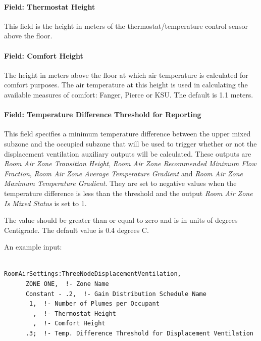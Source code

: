 \paragraph{Field: Thermostat Height}\label{field-thermostat-height-1}

This field is the height in meters of the thermostat/temperature control sensor above the floor.

\paragraph{Field: Comfort Height}\label{field-comfort-height}

The height in meters above the floor at which air temperature is calculated for comfort purposes. The air temperature at this height is used in calculating the available measures of comfort: Fanger, Pierce or KSU. The default is 1.1 meters.

\paragraph{Field: Temperature Difference Threshold for Reporting}\label{field-temperature-difference-threshold-for-reporting}

This field specifies a minimum temperature difference between the upper mixed subzone and the occupied subzone that will be used to trigger whether or not the displacement ventilation auxiliary outputs will be calculated. These outputs are \emph{Room Air Zone Transition Height}, \emph{Room Air Zone Recommended Minimum Flow Fraction}, \emph{Room Air Zone Average Temperature Gradient} and \emph{Room Air Zone Maximum Temperature Gradient}. They are set to negative values when the temperature difference is less than the threshold and the output \emph{Room Air Zone Is Mixed Status} is set to 1.

The value should be greater than or equal to zero and is in units of degrees Centigrade. The default value is 0.4 degrees C.

An example input:

\begin{lstlisting}

RoomAirSettings:ThreeNodeDisplacementVentilation,
      ZONE ONE,  !- Zone Name
      Constant - .2,  !- Gain Distribution Schedule Name
       1,  !- Number of Plumes per Occupant
        ,  !- Thermostat Height
        ,  !- Comfort Height
      .3;  !- Temp. Difference Threshold for Displacement Ventilation
\end{lstlisting}

